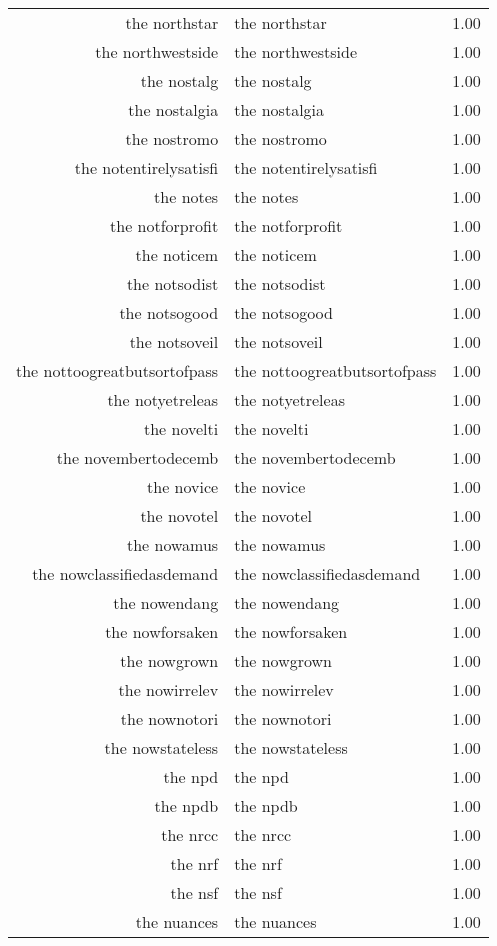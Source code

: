 \begin{table}[ht]
\begin{tabular}{rlr}
  the northstar & the northstar & 1.00 \\ 
  the northwestside & the northwestside & 1.00 \\ 
  the nostalg & the nostalg & 1.00 \\ 
  the nostalgia & the nostalgia & 1.00 \\ 
  the nostromo & the nostromo & 1.00 \\ 
  the notentirelysatisfi & the notentirelysatisfi & 1.00 \\ 
  the notes & the notes & 1.00 \\ 
  the notforprofit & the notforprofit & 1.00 \\ 
  the noticem & the noticem & 1.00 \\ 
  the notsodist & the notsodist & 1.00 \\ 
  the notsogood & the notsogood & 1.00 \\ 
  the notsoveil & the notsoveil & 1.00 \\ 
  the nottoogreatbutsortofpass & the nottoogreatbutsortofpass & 1.00 \\ 
  the notyetreleas & the notyetreleas & 1.00 \\ 
  the novelti & the novelti & 1.00 \\ 
  the novembertodecemb & the novembertodecemb & 1.00 \\ 
  the novice & the novice & 1.00 \\ 
  the novotel & the novotel & 1.00 \\ 
  the nowamus & the nowamus & 1.00 \\ 
  the nowclassifiedasdemand & the nowclassifiedasdemand & 1.00 \\ 
  the nowendang & the nowendang & 1.00 \\ 
  the nowforsaken & the nowforsaken & 1.00 \\ 
  the nowgrown & the nowgrown & 1.00 \\ 
  the nowirrelev & the nowirrelev & 1.00 \\ 
  the nownotori & the nownotori & 1.00 \\ 
  the nowstateless & the nowstateless & 1.00 \\ 
  the npd & the npd & 1.00 \\ 
  the npdb & the npdb & 1.00 \\ 
  the nrcc & the nrcc & 1.00 \\ 
  the nrf & the nrf & 1.00 \\ 
  the nsf & the nsf & 1.00 \\ 
  the nuances & the nuances & 1.00 \\ 

\end{tabular}
\end{table}
